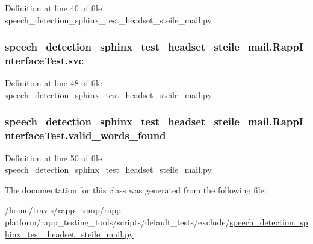 Definition at line 40 of file speech\-\_\-detection\-\_\-sphinx\-\_\-test\-\_\-headset\-\_\-steile\-\_\-mail.\-py.

\hypertarget{classspeech__detection__sphinx__test__headset__steile__mail_1_1RappInterfaceTest_afce233deb70adc082745ccc4d5b04a6b}{
\subsubsection[{svc}]{\setlength{\rightskip}{0pt plus 5cm}speech\-\_\-detection\-\_\-sphinx\-\_\-test\-\_\-headset\-\_\-steile\-\_\-mail.\-Rapp\-Interface\-Test.\-svc}}\label{classspeech__detection__sphinx__test__headset__steile__mail_1_1RappInterfaceTest_afce233deb70adc082745ccc4d5b04a6b}


Definition at line 48 of file speech\-\_\-detection\-\_\-sphinx\-\_\-test\-\_\-headset\-\_\-steile\-\_\-mail.\-py.

\hypertarget{classspeech__detection__sphinx__test__headset__steile__mail_1_1RappInterfaceTest_a74a33a32932e88ab5786f90fd23f89bd}{
\subsubsection[{valid\-\_\-words\-\_\-found}]{\setlength{\rightskip}{0pt plus 5cm}speech\-\_\-detection\-\_\-sphinx\-\_\-test\-\_\-headset\-\_\-steile\-\_\-mail.\-Rapp\-Interface\-Test.\-valid\-\_\-words\-\_\-found}}\label{classspeech__detection__sphinx__test__headset__steile__mail_1_1RappInterfaceTest_a74a33a32932e88ab5786f90fd23f89bd}


Definition at line 50 of file speech\-\_\-detection\-\_\-sphinx\-\_\-test\-\_\-headset\-\_\-steile\-\_\-mail.\-py.



The documentation for this class was generated from the following file\-:\begin{DoxyCompactItemize}
\item 
/home/travis/rapp\-\_\-temp/rapp-\/platform/rapp\-\_\-testing\-\_\-tools/scripts/default\-\_\-tests/exclude/\hyperlink{speech__detection__sphinx__test__headset__steile__mail_8py}{speech\-\_\-detection\-\_\-sphinx\-\_\-test\-\_\-headset\-\_\-steile\-\_\-mail.\-py}\end{DoxyCompactItemize}
